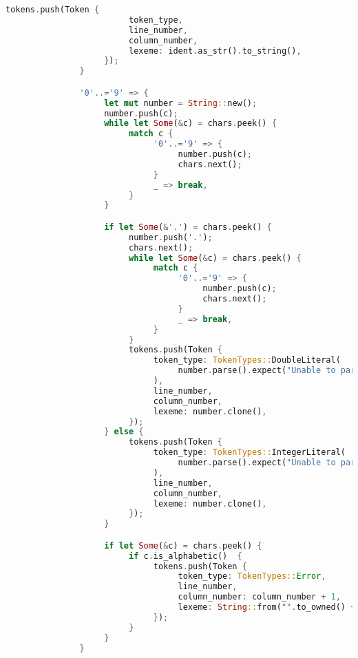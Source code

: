 \documentclass[12pt]{article}
\begin{document}
{\begin{lstlisting}[language=Rust]
                    tokens.push(Token {
                         token_type,
                         line_number,
                         column_number,
                         lexeme: ident.as_str().to_string(),
                    });
               }

               '0'..='9' => {
                    let mut number = String::new();
                    number.push(c);
                    while let Some(&c) = chars.peek() {
                         match c {
                              '0'..='9' => {
                                   number.push(c);
                                   chars.next();
                              }
                              _ => break,
                         }
                    }

                    if let Some(&'.') = chars.peek() {
                         number.push('.');
                         chars.next();
                         while let Some(&c) = chars.peek() {
                              match c {
                                   '0'..='9' => {
                                        number.push(c);
                                        chars.next();
                                   }
                                   _ => break,
                              }
                         }
                         tokens.push(Token {
                              token_type: TokenTypes::DoubleLiteral(
                                   number.parse().expect("Unable to parse double"),
                              ),
                              line_number,
                              column_number,
                              lexeme: number.clone(),
                         });
                    } else {
                         tokens.push(Token {
                              token_type: TokenTypes::IntegerLiteral(
                                   number.parse().expect("Unable to parse integer"),
                              ),
                              line_number,
                              column_number,
                              lexeme: number.clone(),
                         });
                    }

                    if let Some(&c) = chars.peek() {
                         if c.is_alphabetic()  {
                              tokens.push(Token {
                                   token_type: TokenTypes::Error,
                                   line_number,
                                   column_number: column_number + 1,
                                   lexeme: String::from("".to_owned() + &c.to_string()),
                              });
                         }
                    }
               }


\end{lstlisting}}
\end{document}
